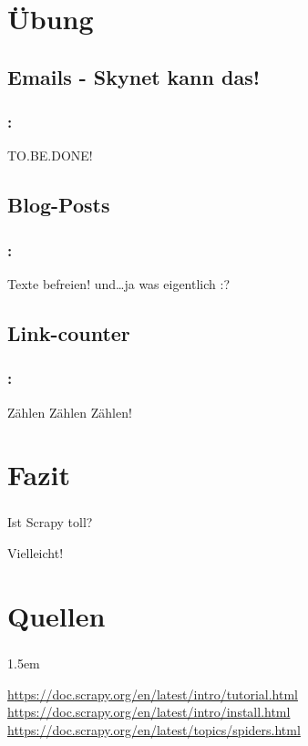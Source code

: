 \documentclass{beamer}
\begin{document}
\section{Übung}

\subsection{Emails - Skynet kann das!}
\begin{frame}
	\frametitle{\insertsection{}: \insertsubsection{}}
	\rightarrow TO.BE.DONE!
\end{frame}

\subsection{Blog-Posts}
\begin{frame}
	\frametitle{\insertsection{}: \insertsubsection{}}	
	\rightarrow Texte befreien! und\ldots ja was eigentlich :?
\end{frame}

\subsection{Link-counter}
\begin{frame}
	\frametitle{\insertsection{}: \insertsubsection{}}
	\rightarrow Zählen Zählen Zählen!
\end{frame}


\section{Fazit}
\begin{frame}
	\frametitle{\insertsection{}}
Ist Scrapy toll?

Vielleicht!
\end{frame}

\section{Quellen}
\begin{frame}
	\frametitle{\insertsection{}}
	\emergencystretch 1.5em
	{\small
	\begin{thebibliography}{8}
		\url{https://doc.scrapy.org/en/latest/intro/tutorial.html}
		\url{https://doc.scrapy.org/en/latest/intro/install.html}
		\url{https://doc.scrapy.org/en/latest/topics/spiders.html}
	\end{thebibliography}
	}
\end{frame}
\end{document}
